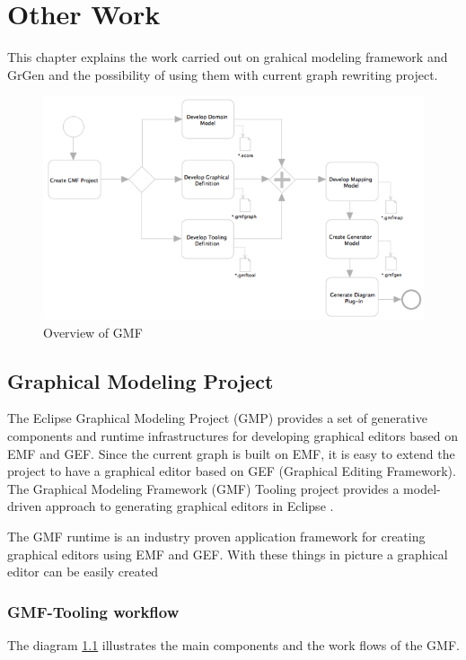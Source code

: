 \chapter{Other Work} \label{gmf}
This chapter explains the work carried out on grahical modeling framework and GrGen and the possibility of using them with current graph rewriting project.

\begin{figure}
 \centerline{
 \includegraphics[width=1.0\columnwidth]{figures/gmf.png}
 }
 \caption{Overview of GMF}
 \label{gmf}
 \end{figure}

\section{Graphical Modeling Project}
The Eclipse Graphical Modeling Project (GMP) provides a set of generative components and runtime infrastructures for developing graphical editors based on EMF and GEF. Since the current graph is built on EMF, it is easy to extend the project to have a graphical editor based on GEF (Graphical Editing Framework). The Graphical Modeling Framework (GMF) Tooling project provides a model-driven approach to generating graphical editors in Eclipse \cite{gmf}.

The GMF runtime is an industry proven application framework for creating graphical editors using EMF and GEF. With these things in picture a graphical editor can be easily created 

\subsection{GMF-Tooling workflow}
The diagram \ref{gmf} illustrates the main components and the work flows of the GMF. 

